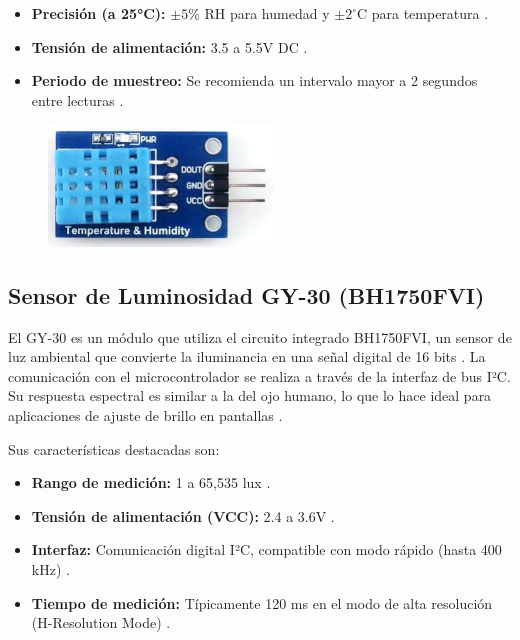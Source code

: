 \begin{itemize}
    \item \textbf{Precisión (a 25°C):} $\pm5\%$ RH para humedad y $\pm2^{\circ}$C para temperatura \cite{dht11}.
    \item \textbf{Tensión de alimentación:} 3.5 a 5.5V DC \cite{dht11}.
    \item \textbf{Periodo de muestreo:} Se recomienda un intervalo mayor a 2 segundos entre lecturas \cite{dht11}.
\end{itemize}
\begin{figure}[H]
    \centering
    \includegraphics[width=0.53\textwidth]{Diagramas/temp.png}
\end{figure}

\subsection{Sensor de Luminosidad GY-30 (BH1750FVI)}

El GY-30 es un módulo que utiliza el circuito integrado BH1750FVI, un sensor de luz ambiental que convierte la iluminancia en una señal digital de 16 bits \cite{gy30}. La comunicación con el microcontrolador se realiza a través de la interfaz de bus I²C. Su respuesta espectral es similar a la del ojo humano, lo que lo hace ideal para aplicaciones de ajuste de brillo en pantallas \cite{gy30}.

Sus características destacadas son:


\begin{itemize}
    \item \textbf{Rango de medición:} 1 a 65,535 lux \cite{gy30}.
    \item \textbf{Tensión de alimentación (VCC):} 2.4 a 3.6V \cite{gy30}.
    \item \textbf{Interfaz:} Comunicación digital I²C, compatible con modo rápido (hasta 400 kHz) \cite{gy30}.
    \item \textbf{Tiempo de medición:} Típicamente 120 ms en el modo de alta resolución (H-Resolution Mode) \cite{gy30}.
\end{itemize}

